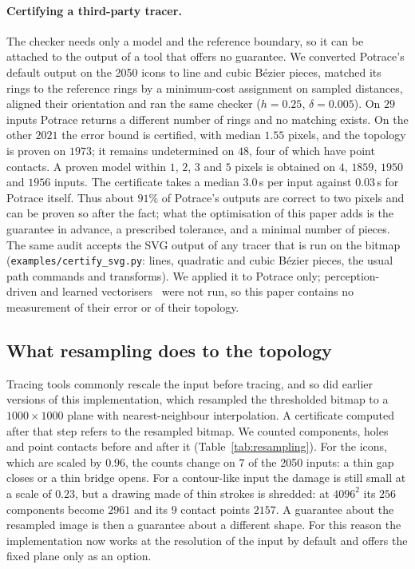 \documentclass[11pt,a4paper]{article}
\theoremstyle{definition}
\theoremstyle{remark}
\begin{document}
\paragraph{Certifying a third-party tracer.} The checker needs only a model
and the reference boundary, so it can be attached to the output of a tool
that offers no guarantee. We converted Potrace's default output on the 2050
icons to line and cubic B\'ezier pieces, matched its rings to the reference
rings by a minimum-cost assignment on sampled distances, aligned their
orientation and ran the same checker ($h=0.25$, $\delta=0.005$). On $29$
inputs Potrace returns a different number of rings and no matching exists.
On the other $2021$ the error bound is certified, with median $1.55$ pixels,
and the topology is proven on $1973$; it remains undetermined on $48$, four of
which have point contacts. A proven model within $1$, $2$, $3$ and $5$ pixels
is obtained on $4$, $1859$, $1950$ and $1956$ inputs. The certificate takes a
median $3.0$\,s per input against $0.03$\,s for Potrace itself. Thus about
$91\%$ of Potrace's outputs are correct to two pixels and can be proven so
after the fact; what the optimisation of this paper adds is the guarantee in
advance, a prescribed tolerance, and a minimal number of pieces. The same
audit accepts the SVG output of any tracer that is run on the bitmap
(\texttt{examples/certify\_svg.py}: lines, quadratic and cubic B\'ezier
pieces, the usual path commands and transforms). We applied it to Potrace
only; perception-driven and learned
vectorisers~\cite{hoshyari2018,dominici2020,rodriguez2025} were not run, so
this paper contains no measurement of their error or of their topology.

\subsection{What resampling does to the topology}\label{sec:resampling}

Tracing tools commonly rescale the input before tracing, and so did earlier
versions of this implementation, which resampled the thresholded bitmap to a
$1000\times1000$ plane with nearest-neighbour interpolation. A certificate
computed after that step refers to the resampled bitmap. We counted
components, holes and point contacts before and after it
(Table~\ref{tab:resampling}). For the icons, which are scaled by $0.96$, the
counts change on $7$ of the 2050 inputs: a thin gap closes or a thin bridge
opens. For a contour-like input the damage is still small at a scale of
$0.23$, but a drawing made of thin strokes is shredded: at $4096^2$ its $256$
components become $2961$ and its $9$ contact points $2157$. A guarantee about
the resampled image is then a guarantee about a different shape. For this
reason the implementation now works at the resolution of the input by
default and offers the fixed plane only as an option.
\end{document}
